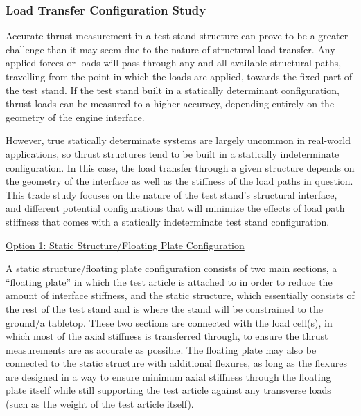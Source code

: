 \subsubsection{Load Transfer Configuration Study}

Accurate thrust measurement in a test stand structure can prove to be a greater challenge than it may seem due to the nature of structural load transfer. Any applied forces or loads will pass through any and all available structural paths, travelling from the point in which the loads are applied, towards the fixed part of the test stand. If the test stand built in a statically determinant configuration, thrust loads can be measured to a higher accuracy, depending entirely on the geometry of the engine interface.

However, true statically determinate systems are largely uncommon in real-world applications, so thrust structures tend to be built in a statically indeterminate configuration. In this case, the load transfer through a given structure depends on the geometry of the interface as well as the stiffness of the load paths in question. This trade study focuses on the nature of the test stand’s structural interface, and different potential configurations that will minimize the effects of load path stiffness that comes with a statically indeterminate test stand configuration.

\noindent\underline{Option 1: Static Structure/Floating Plate Configuration}

A static structure/floating plate configuration consists of two main sections, a “floating plate” in which the test article is attached to in order to reduce the amount of interface stiffness, and the static structure, which essentially consists of the rest of the test stand and is where the stand will be constrained to the ground/a tabletop. These two sections are connected with the load cell(s), in which most of the axial stiffness is transferred through, to ensure the thrust measurements are as accurate as possible. The floating plate may also be connected to the static structure with additional flexures, as long as the flexures are designed in a way to ensure minimum axial stiffness through the floating plate itself while still supporting the test article against any transverse loads (such as the weight of the test article itself).

\begin{figure}
    \centering
    \hspace{3em}
    \caption{}
    \label{fig:static-floating-plate-example}
\end{figure}

